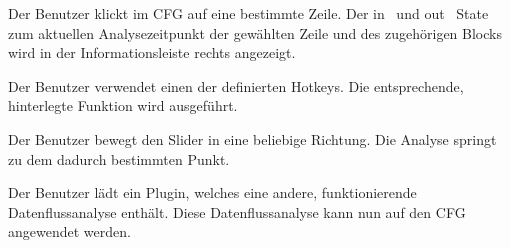 {Der Benutzer klickt im CFG auf eine bestimmte Zeile.}
{Der \glqq in \grqq\ und \glqq out \grqq\ State zum aktuellen Analysezeitpunkt der gewählten Zeile und des zugehörigen Blocks wird in der Informationsleiste rechts angezeigt.}

{Der Benutzer verwendet einen der definierten Hotkeys.}
{Die entsprechende, hinterlegte Funktion wird ausgeführt.}


{Der Benutzer bewegt den Slider in eine beliebige Richtung.}
{Die Analyse springt zu dem dadurch bestimmten Punkt.}


{Der Benutzer lädt ein Plugin, welches eine andere, funktionierende Datenflussanalyse enthält.}
{Diese Datenflussanalyse kann nun auf den CFG angewendet werden.}